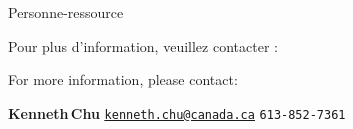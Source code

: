 

\begin{frame}{\vskip -0.1cm \huge Personne-ressource}

\large

\begin{center}
\begin{multicols}{2}
	\begin{minipage}{4.5cm}
	\vskip -2.6cm
	\begin{center}
	Pour plus d'information,
	\vskip -0.01cm
	\noindent
	veuillez contacter :
	\end{center}
	\end{minipage}
\columnbreak
	\begin{minipage}{4.0cm}
	\vskip -2.5cm
	\begin{center}
	For more information,
	\vskip -0.01cm
	\noindent
	please contact\!:
	\end{center}
	\end{minipage}
\end{multicols}
\end{center}

\begin{center}
\vskip 0.5cm
\textbf{\huge Kenneth\;\,Chu}
\vskip 0.15cm
\href{mailto:kenneth.chu@canada.ca}{\Large\color{darkBlue}\underline{\texttt{kenneth.chu@canada.ca}}}
\vskip 0.24cm
\texttt{\Large 613-852-7361}
\end{center}
%
\end{frame}

%
%
%
%
